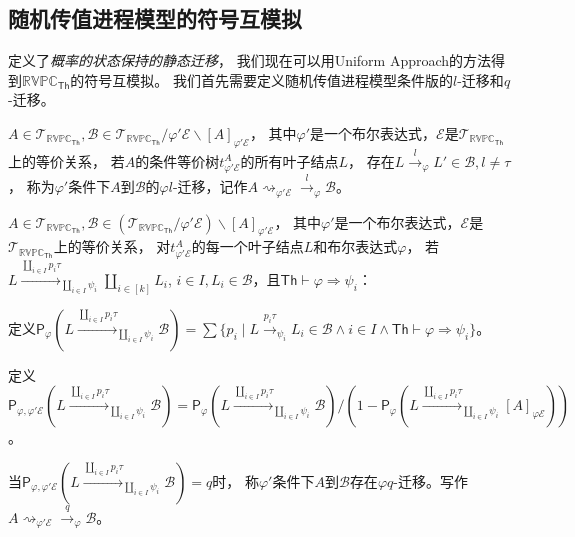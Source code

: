 \subsection{随机传值进程模型的符号互模拟}\label{ch:symbolic_bisimulation}
定义了\textit{概率的状态保持的静态迁移}，
我们现在可以用Uniform Approach的方法得到$\mathbb{RVPC}_{\mathsf{Th}}$的符号互模拟。
我们首先需要定义随机传值进程模型条件版的$l$-迁移和$q$-迁移。

\begin{definition}
   $A\in \mathcal{T}_{\mathbb{RVPC}_{\mathsf{Th}}}, \mathcal{B}\in \mathcal{T}_{\mathbb{RVPC}_{\mathsf{Th}}}/\varphi'\mathcal{E}\backslash [A]_{\varphi'\mathcal{E}}$，
   其中$\varphi'$是一个布尔表达式，$\mathcal{E}$是$\mathcal{T}_{\mathbb{RVPC}_{\mathsf{Th}}}$上的等价关系，
   若$A$的条件等价树$t_{\varphi' \mathcal{E}}^A$的所有叶子结点$L$，
   存在$L\stackrel{l}{\rightarrow}_{\varphi} L'\in \mathcal{B},l\neq \tau$，
   称为$\varphi'$条件下$A$到$\mathcal{B}$的$\varphi l$-迁移，记作$A\rightsquigarrow_{\varphi'\mathcal{E}}\stackrel{l}{\rightarrow}_{\varphi}\mathcal{B}$。
\end{definition}

\begin{definition}
   $A\in \mathcal{T}_{\mathbb{RVPC}_{\mathsf{Th}}},\mathcal{B}\in (\mathcal{T}_{\mathbb{RVPC}_{\mathsf{Th}}}/\varphi' \mathcal{E})\backslash [A]_{\varphi'\mathcal{E}}$，
   其中$\varphi'$是一个布尔表达式，$\mathcal{E}$是$\mathcal{T}_{\mathbb{RVPC}_{\mathsf{Th}}}$上的等价关系，
   对$t^A_{\varphi' \mathcal{E}}$的每一个叶子结点$L$和布尔表达式$\varphi$，
   若$L\stackrel{\coprod_{i\in I}p_i\tau}{\longrightarrow}_{\coprod_{i\in I}\psi_i} \coprod_{i\in [k]}L_i$,
$i\in I, L_i\in \mathcal{B}$，且$\mathsf{Th}\vdash \varphi \Rightarrow \psi_i$：

定义$\mathsf{P}_\varphi(L\stackrel{\coprod_{i\in I}p_i\tau}{\longrightarrow}_{\coprod_{i\in I}\psi_i}\mathcal{B}) = \sum\{p_i\mid L\stackrel{p_i\tau}{\rightarrow}_{\psi_i} L_i\in\mathcal{B} \wedge i\in I \wedge \mathsf{Th}\vdash \varphi \Rightarrow \psi_i\}$。

定义$\mathsf{P}_{\varphi, \varphi' \mathcal{E}}(L\stackrel{\coprod_{i\in I}p_i\tau}{\longrightarrow}_{\coprod_{i\in I}\psi_i}\mathcal{B}) = \mathsf{P}_\varphi(L\stackrel{\coprod_{i\in I}p_i\tau}{\longrightarrow}_{\coprod_{i\in I}\psi_i}\mathcal{B})/(1-\mathsf{P}_\varphi(L\stackrel{\coprod_{i\in I}p_i\tau}{\longrightarrow}_{\coprod_{i\in I}\psi_i}[A]_{\varphi\mathcal{E}}))$。

当$\mathsf{P}_{\varphi,\varphi' \mathcal{E}}(L\stackrel{\coprod_{i\in I}p_i\tau}{\longrightarrow}_{\coprod_{i\in I}\psi_i}\mathcal{B})=q$时，
称$\varphi'$条件下$A$到$\mathcal{B}$存在$\varphi q$-迁移。写作$A\rightsquigarrow_{\varphi'\mathcal{E}} \stackrel{q}{\rightarrow}_{\varphi} \mathcal{B}$。
\end{definition}

